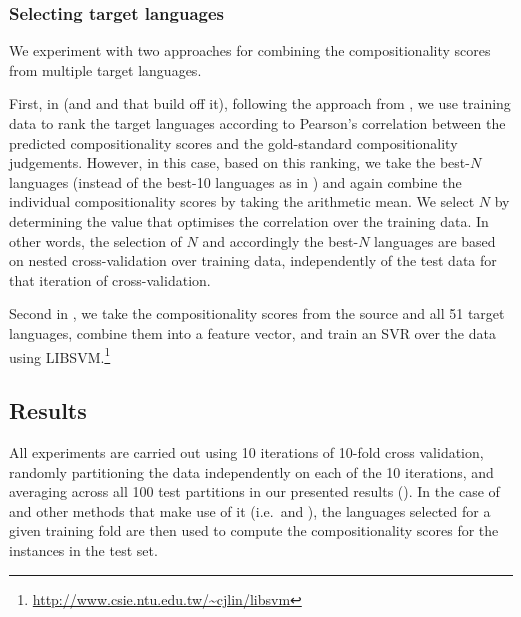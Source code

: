 \documentclass[output=paper,modfonts,nonflat]{langsci/langscibook}
\begin{document}
\subsubsection{Selecting target languages}
\label{sec:lang-selection}

We experiment with two approaches for combining the compositionality
scores from multiple target languages.

First, in \CStarg (and \CSsourcetarg and \CSall that build off it),
following the approach from , we use
training data to rank the target languages according to Pearson's
correlation between the predicted compositionality scores and the
gold-standard compositionality judgements. However, in this case,
based on this ranking, we take the best-$N$ languages (instead of the
best-10 languages as in ) and again
combine the individual compositionality scores by taking the
arithmetic mean. We select $N$ by determining the value that optimises
the correlation over the training data. In other words, the selection
of $N$ and accordingly the best-$N$ languages are based on nested
cross-validation over training data, independently of the test data
for that iteration of cross-validation.

Second in \CSsvr, we take the compositionality scores from the
source and all 51 target languages, combine them into a feature vector, and train an
SVR over the data using
LIBSVM.\footnote{\smaller\url{http://www.csie.ntu.edu.tw/~cjlin/libsvm}}


\subsection{Results}

All experiments are carried out using 10 iterations of 10-fold cross
validation, randomly partitioning the data independently on each of the
10 iterations, and averaging across all 100 test partitions in our
presented results (). In the case of \CStarg and other methods that make
use of it (i.e.\ \CSsourcetarg and \CSall), the languages selected for a
given training fold are then used to compute the compositionality scores
for the instances in the test set. 
\end{document}
